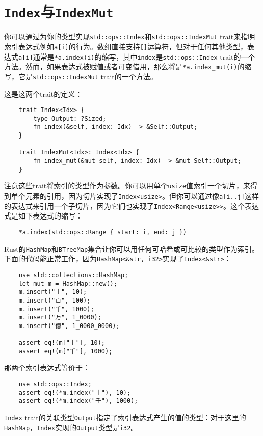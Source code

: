 \section{\texttt{Index}与\texttt{IndexMut}}\label{index}

你可以通过为你的类型实现\texttt{std::ops::Index}和\texttt{std::ops::IndexMut} trait来指明索引表达式例如\texttt{a[i]}的行为。数组直接支持\texttt{[]}运算符，但对于任何其他类型，表达式\texttt{a[i]}通常是\texttt{*a.index(i)}的缩写，其中\texttt{index}是\texttt{std::ops::Index} trait的一个方法。然而，如果表达式被赋值或者可变借用，那么将是\texttt{*a.index\_mut(i)}的缩写，它是\texttt{std::ops::IndexMut} trait的一个方法。

这是这两个trait的定义：
\begin{verbatim}
    trait Index<Idx> {
        type Output: ?Sized;
        fn index(&self, index: Idx) -> &Self::Output;
    }

    trait IndexMut<Idx>: Index<Idx> {
        fn index_mut(&mut self, index: Idx) -> &mut Self::Output;
    }
\end{verbatim}

注意这些trait将索引的类型作为参数。你可以用单个\texttt{usize}值索引一个切片，来得到单个元素的引用，因为切片实现了\texttt{Index<usize>}。但你可以通过像\texttt{a[i..j]}这样的表达式来引用一个子切片，因为它们也实现了\texttt{Index<Range<usize>>}。这个表达式是如下表达式的缩写：
\begin{verbatim}
    *a.index(std::ops::Range { start: i, end: j })
\end{verbatim}

Rust的\texttt{HashMap}和\texttt{BTreeMap}集合让你可以用任何可哈希或可比较的类型作为索引。下面的代码能正常工作，因为\texttt{HashMap<\&str, i32>}实现了\texttt{Index<\&str>}：
\begin{verbatim}
    use std::collections::HashMap;
    let mut m = HashMap::new();
    m.insert("十", 10);
    m.insert("百", 100);
    m.insert("千", 1000);
    m.insert("万", 1_0000);
    m.insert("億", 1_0000_0000);

    assert_eq!(m["十"], 10);
    assert_eq!(m["千"], 1000);
\end{verbatim}

那两个索引表达式等价于：
\begin{verbatim}
    use std::ops::Index;
    assert_eq!(*m.index("十"), 10);
    assert_eq!(*m.index("千"), 1000);
\end{verbatim}

\texttt{Index} trait的关联类型\texttt{Output}指定了索引表达式产生的值的类型：对于这里的\texttt{HashMap}，\texttt{Index}实现的\texttt{Output}类型是\texttt{i32}。

